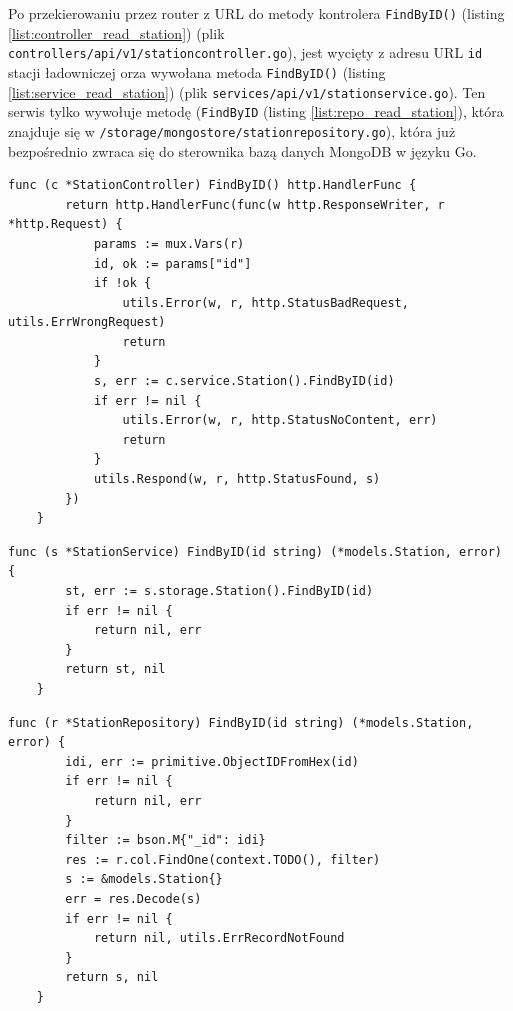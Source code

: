 Po przekierowaniu przez router z URL do metody kontrolera \texttt{FindByID()} (listing \ref{list:controller_read_station}) (plik \texttt{controllers/api/v1/stationcontroller.go}), jest wycięty z adresu URL \texttt{id} stacji ładowniczej orza wywołana metoda \texttt{FindByID()} (listing \ref{list:service_read_station}) (plik \texttt{services/api/v1/stationservice.go}).
Ten serwis tylko wywołuje metodę (\texttt{FindByID} (listing \ref{list:repo_read_station}), która znajduje się w \texttt{/storage/mongostore/stationrepository.go}), która już bezpośrednio zwraca się do sterownika bazą danych MongoDB w języku Go.
% 
\begin{lstlisting}[label=list:controller_read_station,caption=Kontroler wczytywania danych stacji ładowniczej,basicstyle=\tiny\ttfamily]
    func (c *StationController) FindByID() http.HandlerFunc {
        return http.HandlerFunc(func(w http.ResponseWriter, r *http.Request) {
            params := mux.Vars(r)
            id, ok := params["id"]
            if !ok {
                utils.Error(w, r, http.StatusBadRequest, utils.ErrWrongRequest)
                return
            }
            s, err := c.service.Station().FindByID(id)
            if err != nil {
                utils.Error(w, r, http.StatusNoContent, err)
                return
            }
            utils.Respond(w, r, http.StatusFound, s)
        })
    }
\end{lstlisting}

\begin{lstlisting}[label=list:service_read_station,caption=Serwis wczytywania danych stacji ładowniczej,basicstyle=\tiny\ttfamily]
    func (s *StationService) FindByID(id string) (*models.Station, error) {
        st, err := s.storage.Station().FindByID(id)
        if err != nil {
            return nil, err
        }
        return st, nil
    }
\end{lstlisting}

\begin{lstlisting}[label=list:repo_read_station,caption=Wyszukiwanie dokumentu w bazie danych,basicstyle=\tiny\ttfamily]
    func (r *StationRepository) FindByID(id string) (*models.Station, error) {
        idi, err := primitive.ObjectIDFromHex(id)
        if err != nil {
            return nil, err
        }
        filter := bson.M{"_id": idi}
        res := r.col.FindOne(context.TODO(), filter)
        s := &models.Station{}
        err = res.Decode(s)
        if err != nil {
            return nil, utils.ErrRecordNotFound
        }
        return s, nil
    }
\end{lstlisting}

